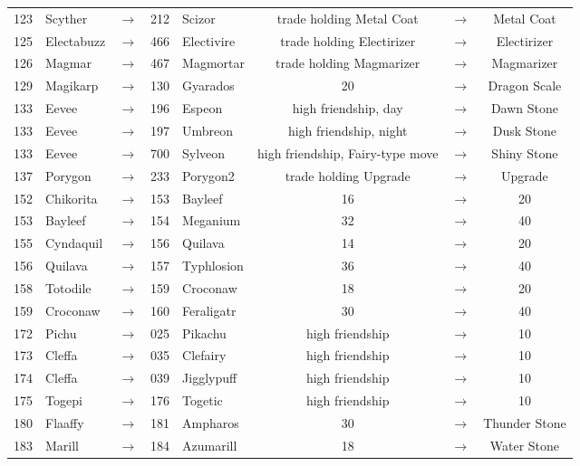 \documentclass{article}
\begin{document}
\begin{longtable}{rlcrl|ccc}
123 & Scyther & $\rightarrow$ & 212 & Scizor & trade holding Metal Coat & $\rightarrow$ & Metal Coat \\
125 & Electabuzz & $\rightarrow$ & 466 & Electivire & trade holding Electirizer & $\rightarrow$ & Electirizer \\
126 & Magmar & $\rightarrow$ & 467 & Magmortar & trade holding Magmarizer & $\rightarrow$ & Magmarizer \\
129 & Magikarp & $\rightarrow$ & 130 & Gyarados & 20 & $\rightarrow$ & Dragon Scale \\
133 & Eevee & $\rightarrow$ & 196 & Espeon & high friendship, day & $\rightarrow$ & Dawn Stone \\
133 & Eevee & $\rightarrow$ & 197 & Umbreon & high friendship, night & $\rightarrow$ & Dusk Stone \\
133 & Eevee & $\rightarrow$ & 700 & Sylveon & high friendship, Fairy-type move & $\rightarrow$ & Shiny Stone \\
137 & Porygon & $\rightarrow$ & 233 & Porygon2 & trade holding Upgrade & $\rightarrow$ & Upgrade \\
\hline %
152 & Chikorita & $\rightarrow$ & 153 & Bayleef & 16 & $\rightarrow$ & 20 \\
153 & Bayleef & $\rightarrow$ & 154 & Meganium & 32 & $\rightarrow$ & 40 \\
155 & Cyndaquil & $\rightarrow$ & 156 & Quilava & 14 & $\rightarrow$ & 20 \\
156 & Quilava & $\rightarrow$ & 157 & Typhlosion & 36 & $\rightarrow$ & 40 \\
158 & Totodile & $\rightarrow$ & 159 & Croconaw & 18 & $\rightarrow$ & 20 \\
159 & Croconaw & $\rightarrow$ & 160 & Feraligatr & 30 & $\rightarrow$ & 40 \\
172 & Pichu & $\rightarrow$ & 025 & Pikachu & high friendship & $\rightarrow$ & 10 \\
173 & Cleffa & $\rightarrow$ & 035 & Clefairy & high friendship & $\rightarrow$ & 10 \\
174 & Cleffa & $\rightarrow$ & 039 & Jigglypuff & high friendship & $\rightarrow$ & 10 \\
175 & Togepi & $\rightarrow$ & 176 & Togetic & high friendship & $\rightarrow$ & 10 \\
180 & Flaaffy & $\rightarrow$ & 181 & Ampharos & 30 & $\rightarrow$ & Thunder Stone \\
183 & Marill & $\rightarrow$ & 184 & Azumarill & 18 & $\rightarrow$ & Water Stone \\

\end{longtable}
\end{document}
